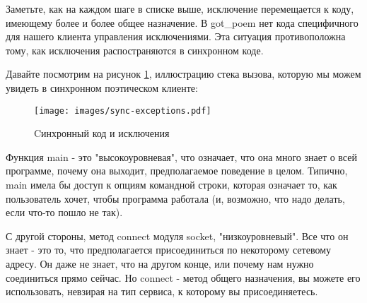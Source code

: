 Заметьте, как на каждом шаге в списке выше, 
исключение перемещается к коду, имеющему более и более  
общее назначение. В got\_poem нет кода специфичного для нашего 
клиента управления исключениями. Эта ситуация противоположна тому, как
исключения распостраняются в синхронном коде.


Давайте посмотрим на рисунок \ref{fig:sync-exceptions}, 
иллюстрацию стека вызова, которую мы можем увидеть в 
синхронном поэтическом клиенте:

\begin{figure}[h]
\begin{center}
    \texttt{[image: images/sync-exceptions.pdf]}
    \caption{Cинхронный код и исключения\label{fig:sync-exceptions}}
\end{center}
\end{figure}


Функция main - это "высокоуровневая", что означает, что она 
много знает о всей программе, почему она выходит, предполагаемое 
поведение в целом. Типично, main имела бы доступ к опциям командной 
строки, которая означает то, как пользователь хочет, чтобы 
программа работала (и, возможно, что надо делать, если что-то 
пошло не так).
 

С другой стороны, метод connect модуля socket, "низкоуровневый". 
Все что он знает - это то, что предполагается присоединиться по 
некоторому сетевому адресу. Он даже не знает, что на другом конце, или 
почему нам нужно соединиться прямо сейчас. Но connect - метод общего 
назначения, вы можете его использовать, невзирая на тип сервиса, к 
которому вы присоединяетесь.


